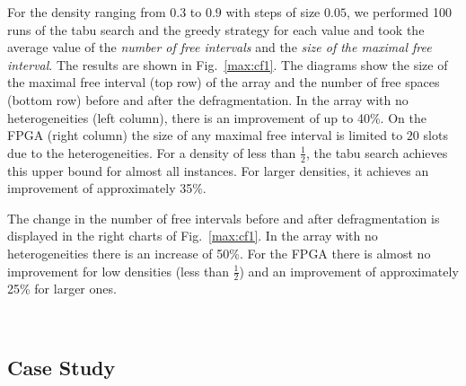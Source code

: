\documentclass{article}
\begin{document}
For the density ranging from $0.3$ to $0.9$ with steps of size
$0.05$, we performed 100 runs of the tabu search and the greedy strategy 
for each value and
took the average value of the {\em number of free intervals} and
the {\em size of the maximal free interval}. The results are shown
in Fig.~\ref{max:cf1}. The diagrams
show the size of the maximal free interval (top row) of the
array and the number of free spaces (bottom row) 
before and after the defragmentation. In the
array with no heterogeneities (left column),
there is an improvement of up to 40\%.
On the FPGA (right column)
the size of any maximal free interval is limited
to $20$ slots due to the heterogeneities. For a density of less than
$\frac{1}{2}$, the tabu search achieves this upper bound for almost
all instances. For larger densities, it achieves an improvement of
approximately 35\%.

The change in the number of free intervals before and after
defragmentation is displayed in the right charts of Fig.~\ref{max:cf1}.
In the array with no heterogeneities there is an
increase of 50\%. For the FPGA there is almost no improvement for low densities (less than $\frac{1}{2}$) and an improvement of approximately 25\% for larger ones.


\begin{figure*}[p]
 \mbox{}\hfill 
  {}
\hfill
  {} 
\hfill\mbox{}\\
 \mbox{}\hfill  
{}
\hfill
  {}
\hfill\mbox{}
\caption{Averages over 100 runs. (Top left)
Size of the maximal free interval before and after
defragmentation, using our heuristic and a simple greedy approach
in an array with no heterogeneities.\newline
(Top right)
Size of the maximal free interval before and after
defragmentation of the FPGA. \newline
(Bottom left)
Number of free intervals before and after defragmentation in an array with no heterogeneities.\newline
(Bottom right)
Number of free intervals before and after defragmentation of
the FPGA.\label{max:cf1}}
\end{figure*}




\subsection{Case Study}
\label{sec:casestudy}
\end{document}
